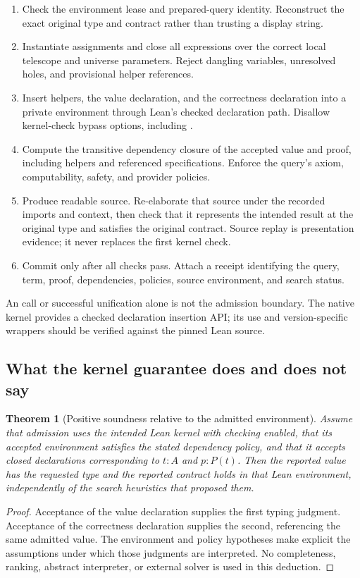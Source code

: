 \documentclass[11pt,letterpaper]{article}
\newcommand{\code}[1]{\texttt{\detokenize{#1}}}
\newtheorem{theorem}{Theorem}[section]
\theoremstyle{definition}\newtheorem{definition}[theorem]{Definition}
\theoremstyle{remark}\newtheorem{remark}[theorem]{Remark}
\begin{document}
\begin{enumerate}
\item Check the environment lease and prepared-query identity. Reconstruct the
exact original type and contract rather than trusting a display string.
\item Instantiate assignments and close all expressions over the correct local
telescope and universe parameters. Reject dangling variables, unresolved holes,
and provisional helper references.
\item Insert helpers, the value declaration, and the correctness declaration into
a private environment through Lean's checked declaration path. Disallow
kernel-check bypass options, including \code{debug.skipKernelTC}.
\item Compute the transitive dependency closure of the accepted value and proof,
including helpers and referenced specifications. Enforce the query's axiom,
computability, safety, and provider policies.
\item Produce readable source. Re-elaborate that source under the recorded imports
and context, then check that it represents the intended result at the original
type and satisfies the original contract. Source replay is presentation evidence;
it never replaces the first kernel check.
\item Commit only after all checks pass. Attach a receipt identifying the query,
term, proof, dependencies, policies, source environment, and search status.
\end{enumerate}

An \code{inferType} call or successful unification alone is not the admission
boundary. The native kernel provides a checked declaration insertion API; its
use and version-specific wrappers should be verified against the pinned Lean
source.\cite{applysource,leanmanual}

\subsection{What the kernel guarantee does and does not say}

\begin{theorem}[Positive soundness relative to the admitted environment]
Assume that admission uses the intended Lean kernel with checking enabled, that
its accepted environment satisfies the stated dependency policy, and that it
accepts closed declarations corresponding to $t:A$ and $p:P(t)$. Then the
reported value has the requested type and the reported contract holds in that
Lean environment, independently of the search heuristics that proposed them.
\end{theorem}
\begin{proof}
Acceptance of the value declaration supplies the first typing judgment.
Acceptance of the correctness declaration supplies the second, referencing the
same admitted value. The environment and policy hypotheses make explicit the
assumptions under which those judgments are interpreted. No completeness,
ranking, abstract interpreter, or external solver is used in this deduction.
\end{proof}
\end{document}
